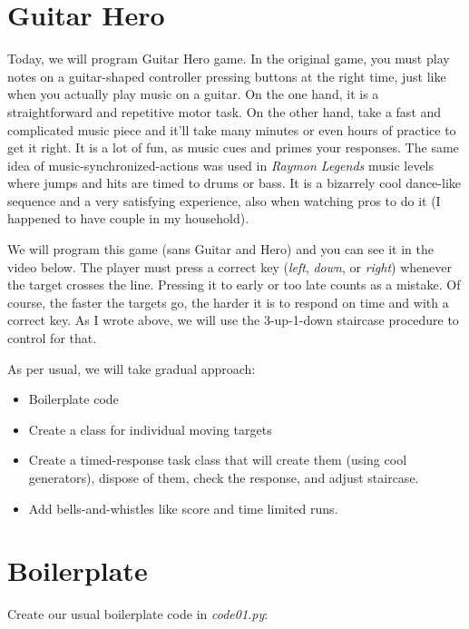 \documentclass[
]{book}
\providecommand{\tightlist}{%
  \setlength{\itemsep}{0pt}\setlength{\parskip}{0pt}}
\begin{document}
\hypertarget{guitar-hero}{%
\section{Guitar Hero}\label{guitar-hero}}

Today, we will program Guitar Hero game. In the original game, you must play notes on a guitar-shaped controller pressing buttons at the right time, just like when you actually play music on a guitar. On the one hand, it is a straightforward and repetitive motor task. On the other hand, take a fast and complicated music piece and it'll take many minutes or even hours of practice to get it right. It is a lot of fun, as music cues and primes your responses. The same idea of music-synchronized-actions was used in \emph{Raymon Legends} music levels where jumps and hits are timed to drums or bass. It is a bizarrely cool dance-like sequence and a very satisfying experience, also when watching pros to do it (I happened to have couple in my household).

We will program this game (sans Guitar and Hero) and you can see it in the video below. The player must press a correct key (\emph{left}, \emph{down}, or \emph{right}) whenever the target crosses the line. Pressing it to early or too late counts as a mistake. Of course, the faster the targets go, the harder it is to respond on time and with a correct key. As I wrote above, we will use the 3-up-1-down staircase procedure to control for that.

As per usual, we will take gradual approach:

\begin{itemize}
\tightlist
\item
  Boilerplate code
\item
  Create a class for individual moving targets
\item
  Create a timed-response task class that will create them (using cool generators), dispose of them, check the response, and adjust staircase.
\item
  Add bells-and-whistles like score and time limited runs.
\end{itemize}

\hypertarget{boilerplate}{%
\section{Boilerplate}\label{boilerplate}}

Create our usual boilerplate code in \emph{code01.py}:
\end{document}
